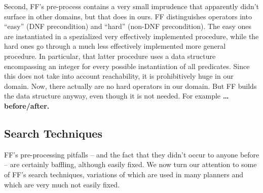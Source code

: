 Second, FF's pre-process contains a very small imprudence that
apparently didn't surface in other domains, but that does in ours. FF
distinguishes operators into ``easy'' (DNF precondition) and ``hard''
(non-DNF precondition). The easy ones are instantiated in a
spezialized very effectively implemented procedure, while the hard
ones go through a much less effectively implemented more general
procedure. In particular, that latter procedure uses a data structure
encompassing an integer for every possible instantiation of all
predicates. Since this does not take into account reachability, it is
prohibitively huge in our domain. Now, there actually are no hard
operators in our domain. But FF builds the data structure anyway, even
though it is not needed. For example {\bf \dots before/after.}


















\subsection{Search Techniques}
\label{sec:crisp-ff:preprocess:heuristics}





FF's pre-processing pitfalls -- and the fact that they didn't occur to
anyone before -- are certainly baffling, although easily fixed. We now
turn our attention to some of FF's search techniques, variations of
which are used in many planners and which are very much not easily
fixed.




